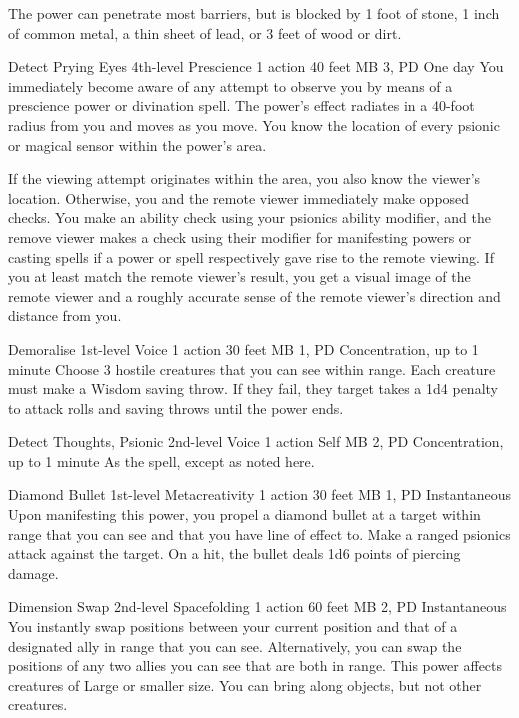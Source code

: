 The power can penetrate most barriers, but is blocked by
1 foot of stone,
1 inch of common metal,
a thin sheet of lead,
or 3 feet of wood or dirt.

\DndPowerHeader%
  {Detect Prying Eyes}
  {4th-level Prescience}
  {1 action}
  {40 feet}
  {MB 3, PD \lvlfour}
  {One day}
You immediately become aware of any attempt to observe you
by means of a prescience power or divination spell.
The power's effect radiates in a 40-foot radius
from you and moves as you move.
You know the location of every psionic or magical sensor
within the power's area.

If the viewing attempt originates within the area,
you also know the viewer's location.
Otherwise, you and the remote viewer immediately make opposed checks.
You make an ability check using your psionics ability modifier,
and the remove viewer makes a check using their modifier
for manifesting powers or casting spells if a power or spell
respectively gave rise to the remote viewing.
If you at least match the remote viewer's result,
you get a visual image of the remote viewer
and a roughly accurate sense of the remote viewer's
direction and distance from you.

\DndPowerHeader%
  {Demoralise}
  {1st-level Voice}
  {1 action}
  {30 feet}
  {MB 1, PD \lvlone}
  {Concentration, up to 1 minute}
Choose 3 hostile creatures that you can see within range.
Each creature must make a Wisdom saving throw.
If they fail, they target takes a 1d4 penalty to attack rolls and
saving throws until the power ends.

\DndPowerHeader%
  {Detect Thoughts, Psionic}
  {2nd-level Voice}
  {1 action}
  {Self}
  {MB 2, PD \lvltwo}
  {Concentration, up to 1 minute}
As the  spell, except as noted here.

\DndPowerHeader%
  {Diamond Bullet}
  {1st-level Metacreativity}
  {1 action}
  {30 feet}
  {MB 1, PD \lvlone}
  {Instantaneous}
Upon manifesting this power,
you propel a diamond bullet at a target within range
that you can see and that you have line of effect to.
Make a ranged psionics attack against the target.
On a hit, the bullet deals 1d6 points of piercing damage.

\DndPowerHeader%
  {Dimension Swap}
  {2nd-level Spacefolding}
  {1 action}
  {60 feet}
  {MB 2, PD \lvltwo}
  {Instantaneous}
You instantly swap positions between your current position
and that of a designated ally in range that you can see.
Alternatively, you can swap the positions of
any two allies you can see that are both in range.
This power affects creatures of Large or smaller size.
You can bring along objects, but not other creatures.

